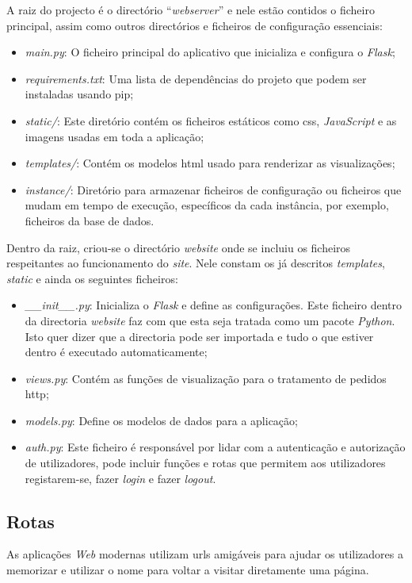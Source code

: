 A raiz do projecto é o directório ``\textit{webserver}'' e nele estão contidos o ficheiro principal, assim como outros directórios e ficheiros de configuração essenciais:
\begin{itemize}
	\item \textit{main.py}: O ficheiro principal do aplicativo que inicializa e configura o \textit{Flask};
	\item \textit{requirements.txt}: Uma lista de dependências do projeto que podem ser instaladas usando \gls{pip};
	\item \textit{static/}: Este diretório contém os ficheiros estáticos como \acrshort{css}, \textit{JavaScript} e as imagens usadas em toda a aplicação;
	\item \textit{templates/}: Contém os modelos \acrshort{html} usado para renderizar as visualizações;
	\item \textit{instance/}: Diretório para armazenar ficheiros de configuração ou ficheiros que mudam em tempo de execução, específicos da cada instância, por exemplo, ficheiros da base de dados.
\end{itemize}

Dentro da raiz, criou-se o directório \textit{website} onde se incluiu os ficheiros respeitantes ao funcionamento do \textit{site}. Nele constam os já descritos \textit{templates}, \textit{static} e ainda os seguintes ficheiros:

\begin{itemize}
	\item \textit{\_\_init\_\_.py}: Inicializa o \textit{Flask} e define as configurações. Este ficheiro dentro da directoria \textit{website} faz com que esta seja tratada como um pacote \textit{Python}. Isto quer dizer que a directoria pode ser importada e tudo o que estiver dentro é executado automaticamente;
	\item \textit{views.py}: Contém as funções de visualização para o tratamento de pedidos \acrfull{http};
	\item \textit{models.py}: Define os modelos de dados para a aplicação;
	\item \textit{auth.py}: Este ficheiro é responsável por lidar com a autenticação e autorização de utilizadores, pode incluir funções e rotas que permitem aos utilizadores registarem-se, fazer \textit{login} e fazer \textit{logout}.
\end{itemize}

\subsection{Rotas}
As aplicações \textit{Web} modernas utilizam \acrshort{url}s amigáveis para ajudar os utilizadores a memorizar e utilizar o nome para voltar a visitar diretamente uma página.

